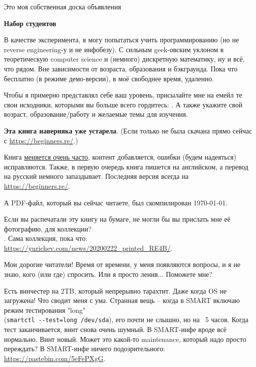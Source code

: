 
\begin{center}
\LARGE{} Это моя собственная доска объявления \normalsize{}
\end{center}

\textbf{Набор студентов}

В качестве эксперимента, я могу попытаться учить программированию (но не reverse engineering-у и не инфобезу). С сильным geek-овским уклоном в теоретическую computer science и (немного) дискретную математику, ну и всё, что рядом. Вне зависимости от возраста, образования и бэкграунда. Пока что бесплатно (в режиме демо-версии), в моё свободнее время, удаленно.

Чтобы я примерно представлял себе ваш уровень, присылайте мне на емейл те свои исходники, которыми вы больше всего гордитесь:
\EMAILS{}.
А также укажите свой возраст, образование/работу и желаемые темы для изучения.

\myhrule{}

\textbf{Эта книга наверняка уже устарела}.
(Если только не была скачана прямо сейчас с \url{https://beginners.re/}.)

Книга \href{\RepoURL/ChangeLog}{меняется очень часто},
контент добавляется, ошибки (будем надеяться) исправляются.
Также, в первую очередь книга пишется на английском, а перевод на русский немного запаздывает.
Последняя версия всегда на \url{https://beginners.re/}.

А PDF-файл, который вы сейчас читаете, был скомпилирован \today{}.

\myhrule{}

Если вы распечатали эту книгу на бумаге, не могли бы вы прислать мне её фотографию, для коллекции?\\
\EMAILS{}.
Сама коллекция, пока что: \url{https://yurichev.com/news/20200222_printed_RE4B/}.

\myhrule{}

Мои дорогие читатели! Время от времени, у меня появляются вопросы, и я не знаю, кого (или где) спросить.
Или я просто ленив...
Поможете мне?

\myhrule{}

Есть винчестер на 2TB, который непрерывно тарахтит.
Даже когда OS не загружена!
Что сводит меня с ума.
Странная вещь -- когда в SMART включаю режим тестирования "long" \\
(\verb|smartctl --test=long /dev/sda|),
его почти не слышно, но на ~5 часов.
Когда тест заканчивается, винт снова очень шумный.
В SMART-инфе вроде всё нормально.
Винт новый.
Может это какой-то maintenance, который надо просто переждать?
В SMART-инфе ничего подозрительного: \url{https://pastebin.com/5eFePXgG}.


